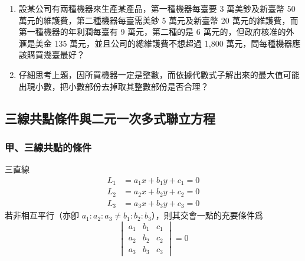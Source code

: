 \begin{enumerate}[label=\arabic*., leftmargin=2em]
  \begin{figure}[H]
  \centering
  \caption{直線傾斜角與垂直關係}
  \label{fig:4-39}
  \end{figure}
  
  \item 設某公司有兩種機器來生產某產品，第一種機器每臺要 3 萬美鈔及新臺幣 50 萬元的維護費，第二種機器每臺需美鈔 5 萬元及新臺幣 20 萬元的維護費，而第一種機器的年利潤每臺有 9 萬元，第二種的是 6 萬元的，但政府核准的外滙是美金 135 萬元，並且公司的總維護費不想超過 1,800 萬元，問每種機器應該購買幾臺最好？
  
  \item 仔細思考上題，因所買機器一定是整數，而依據代數式子解出來的最大值可能出現小數，把小數部份去掉取其整數部份是否合理？
\end{enumerate}


\subsection{三線共點條件與二元一次多式聯立方程}
\label{sec:4-5}

\subsubsection*{甲、三線共點的條件}

\begin{theorem}
三直線
\begin{align*}
L_1 &= a_1 x + b_1 y + c_1 = 0 \\
L_2 &= a_2 x + b_2 y + c_2 = 0 \\
L_3 &= a_3 x + b_3 y + c_3 = 0
\end{align*}
若非相互平行（亦卽 $a_1 : a_2 : a_3 \neq b_1 : b_2 : b_3$），則其交會一點的充要條件爲
\begin{equation}
\begin{vmatrix}
a_1 & b_1 & c_1 \\
a_2 & b_2 & c_2 \\
a_3 & b_3 & c_3
\end{vmatrix} = 0
\label{eq:b3-4-29}
\end{equation}
\end{theorem}


